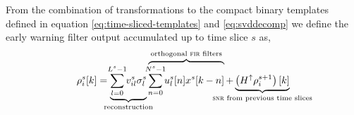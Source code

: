 From the combination of transformations to the compact binary templates defined
in equation \eqref{eq:time-sliced-templates} and \eqref{eq:svddecomp} we define
the early warning filter output accumulated up to time slice $s$ as,
%
%
\begin{equation}
	\rho_i^s [k] =%
		\underbrace{
			\sum_{\mathclap{l=0}}^{\mathclap{L^s-1}} v_{il}^s \sigma_l^s
		}_\textrm{\clap{reconstruction}}
		\overbrace{
			\sum_{\mathclap{n=0}}^{\mathclap{N^s-1}} u_l^s[n] x^s[k-n]
		}^\textrm{\clap{orthogonal {\sc fir} filters}}
		+
		\underbrace{
			\left(H^\uparrow \rho_i^{s+1}\right)[k]
		}_\textrm{\clap{{\sc snr} from previous time slices}}
\end{equation}
%
%
%
%
